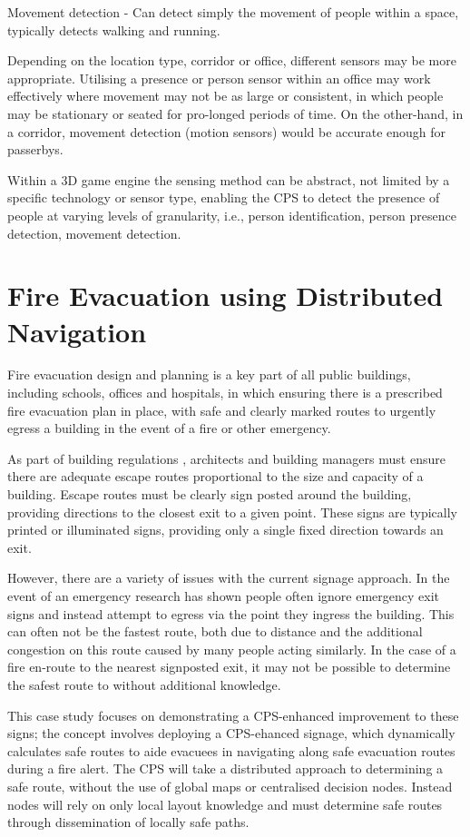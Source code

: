 Movement detection - Can detect simply the movement of people within a space, typically detects walking and running.

Depending on the location type, corridor or office, different sensors may be more appropriate. Utilising a presence or person sensor within an office may work effectively where movement may not be as large or consistent, in which people may be stationary or seated for pro-longed periods of time. On the other-hand, in a corridor, movement detection (motion sensors) would be accurate enough for passerbys.

Within a 3D game engine the sensing method can be abstract, not limited by a specific technology or sensor type, enabling the CPS to detect the presence of people at varying levels of granularity, i.e., person identification, person presence detection, movement detection. 

\section{Fire Evacuation using Distributed Navigation}
Fire evacuation design and planning is a key part of all public buildings, including schools, offices and hospitals, in which ensuring there is a prescribed fire evacuation plan in place, with safe and clearly marked routes to urgently egress a building in the event of a fire or other emergency. 

As part of building regulations \cite{fireLegislation}, architects and building managers must ensure there are adequate escape routes proportional to the size and capacity of a building. Escape routes must be clearly sign posted around the building, providing directions to the closest exit to a given point. These signs are typically printed or illuminated signs, providing only a single fixed direction towards an exit.

However, there are a variety of issues with the current signage approach. In the event of an emergency research has shown people often ignore emergency exit signs and instead attempt to egress via the point they ingress the building. This can often not be the fastest route, both due to distance and the additional congestion on this route caused by many people acting similarly. In the case of a fire en-route to the nearest signposted exit, it may not be possible to determine the safest route to without additional knowledge.

This case study focuses on demonstrating a CPS-enhanced improvement to these signs; the concept involves deploying a CPS-ehanced signage, which dynamically calculates safe routes to aide evacuees in navigating along safe evacuation routes during a fire alert. The CPS will take a distributed approach to determining a safe route, without the use of global maps or centralised decision nodes. Instead nodes will rely on only local layout knowledge and must determine safe routes through dissemination of locally safe paths.


